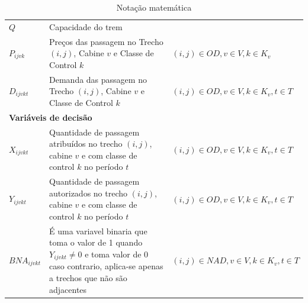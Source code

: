 \begin{table}[h]
\begin{tabular}{p{2cm} p{9.5cm} p{3.2cm}}
		$Q$                & Capacidade do trem                                                                                                                                          &                                              \\
		$P_{ijvk}$         & Preços  das passagem no Trecho $(i,j)$, Cabine $v$ e Classe de Control $k$                                                                                  & $(i,j) \in OD,v \in V, k \in K_v$            \\
		$D_{ijvkt}$        & Demanda  das passagem no Trecho $(i,j)$, Cabine $v$ e Classe de Control $k$                                                                                 & $(i,j) \in OD,v \in V, k \in K_v, t \in T$   \\ \midrule
		\multicolumn{3}{l}{\textbf{Variáveis de decisão}}                                                                                                                                                                               \\ \midrule
		$X_{ijvkt}$        & Quantidade de passagem atribuídos no trecho $(i,j)$, cabine $v$ e com classe de control $k$ no período $t$                                                  & $(i,j) \in OD, v \in V, k \in K_v, t \in T$  \\
		$Y_{ijvkt}$        & Quantidade de passagem autorizados no trecho $(i,j)$, cabine $v$ e com classe de control $k$ no período $t$                                                 & $(i,j) \in OD, v \in V, k \in K_v, t \in T$  \\
		$BNA_{ijvkt}$      & É uma variavel binaria que toma o valor de 1 quando $Y_{ijvkt} \neq 0$ e toma  valor de 0 caso contrario, aplica-se apenas a trechos que não são adjacentes & $(i,j) \in NAD, v \in V, k \in K_v, t \in T$ \\
		\bottomrule
	\end{tabular}
	\caption{Notação matemática}
	\label{tab: m2_definicao}
\end{table}
